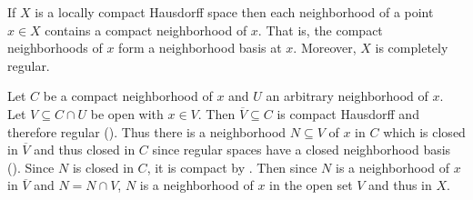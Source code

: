 \documentclass[letterpaper, 11pt, oneside]{book}
\begin{document}
\clearpage

\begin{thrm}
  If $X$ is a locally compact Hausdorff space then each neighborhood of a point $x \in X$ contains a compact neighborhood of $x$.
  That is, the compact neighborhoods of $x$ form a neighborhood basis at $x$.
  Moreover, $X$ is completely regular.
\end{thrm}
\begin{pf}
  Let $C$ be a compact neighborhood of $x$ and $U$ an arbitrary neighborhood of $x$.
  Let $V \subseteq C \cap U$ be open with $x \in V$.
  Then $\overline{V} \subseteq C$ is compact Hausdorff and therefore regular ().
  Thus there is a neighborhood $N \subseteq V$ of $x$ in $C$ which is closed in $\overline{V}$ and thus closed in $C$ since regular spaces have a closed neighborhood basis ().
  Since $N$ is closed in $C$, it is compact by .
  Then since $N$ is a neighborhood of $x$ in $\overline{V}$ and $N = N \cap V$, $N$ is a neighborhood of $x$ in the open set $V$ and thus in $X$.
\end{pf}
\end{document}
